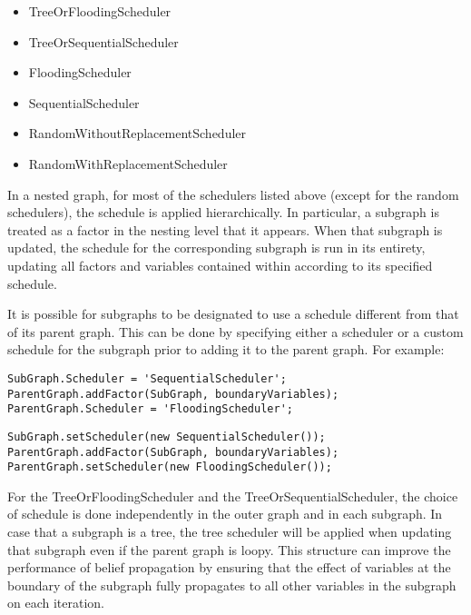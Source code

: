 \begin{itemize}
\item TreeOrFloodingScheduler
\item TreeOrSequentialScheduler
\item FloodingScheduler
\item SequentialScheduler
\item RandomWithoutReplacementScheduler
\item RandomWithReplacementScheduler
\end{itemize}

In a nested graph, for most of the schedulers listed above (except for the random schedulers), the schedule is applied hierarchically.  In particular, a subgraph is treated as a factor in the nesting level that it appears.  When that subgraph is updated, the schedule for the corresponding subgraph is run in its entirety, updating all factors and variables contained within according to its specified schedule.

It is possible for subgraphs to be designated to use a schedule different from that of its parent graph.  This can be done by specifying either a scheduler or a custom schedule for the subgraph prior to adding it to the parent graph.  For example:

\ifmatlab

\begin{lstlisting}
SubGraph.Scheduler = 'SequentialScheduler';
ParentGraph.addFactor(SubGraph, boundaryVariables);
ParentGraph.Scheduler = 'FloodingScheduler';
\end{lstlisting}

\fi

\ifjava

\begin{lstlisting}
SubGraph.setScheduler(new SequentialScheduler());
ParentGraph.addFactor(SubGraph, boundaryVariables);
ParentGraph.setScheduler(new FloodingScheduler());
\end{lstlisting}

\fi

For the TreeOrFloodingScheduler and the TreeOrSequentialScheduler, the choice of schedule is done independently in the outer graph and in each subgraph.  In case that a subgraph is a tree, the tree scheduler will be applied when updating that subgraph even if the parent graph is loopy.  This structure can improve the performance of belief propagation by ensuring that the effect of variables at the boundary of the subgraph fully propagates to all other variables in the subgraph on each iteration.

